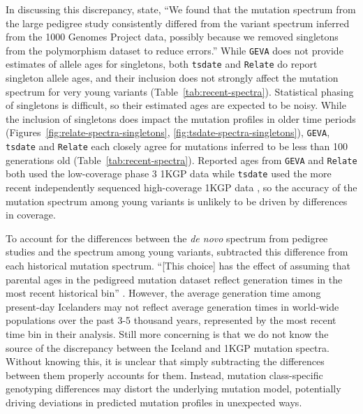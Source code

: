 \documentclass[]{article}
\newcommand{\GEVA}{\texttt{GEVA}\xspace}
\newcommand{\tsdate}{\texttt{tsdate}\xspace}
\newcommand{\relate}{\texttt{Relate}\xspace}
\begin{document}
In discussing this discrepancy, \citet{wang2023human} state, ``We found that
the mutation spectrum from the large pedigree study consistently differed from
the variant spectrum inferred from the 1000 Genomes Project data, possibly
because we removed singletons from the polymorphism dataset to reduce errors.''
While \GEVA does not provide estimates of allele ages for singletons, both
\tsdate and \relate do report singleton allele ages, and their inclusion does
not strongly affect the mutation spectrum for very young variants
(Table~\ref{tab:recent-spectra}). Statistical phasing of singletons is
difficult, so their estimated ages are expected to be noisy. While the
inclusion of singletons does impact the mutation profiles in older time periods
(Figures~\ref{fig:relate-spectra-singletons},
\ref{fig:tsdate-spectra-singletons}), \GEVA, \tsdate and \relate each closely
agree for mutations inferred to be less than 100 generations old
(Table~\ref{tab:recent-spectra}). Reported ages from \GEVA and \relate both
used the low-coverage phase 3 1KGP data while \tsdate used the more recent
independently sequenced high-coverage 1KGP data \citep{byrska2022high}, so the
accuracy of the mutation spectrum among young variants is unlikely to be driven
by differences in coverage.

To account for the differences between the \emph{de novo} spectrum from
pedigree studies \citep{jonsson2017parental} and the spectrum among young
variants, \citet{wang2023human} subtracted this difference from each historical
mutation spectrum. ``[This choice] has the effect of assuming that parental ages
in the pedigreed mutation dataset reflect generation times in the most recent
historical bin'' \citep{wang2023human}. However, the average generation time
among present-day Icelanders may not reflect average generation times in
world-wide populations over the past 3-5 thousand years, represented by the
most recent time bin in their analysis. Still more concerning is that we do not
know the source of the discrepancy between the Iceland and 1KGP mutation
spectra. Without knowing this, it is unclear that simply subtracting the
differences between them properly accounts for them. Instead, mutation
class-specific genotyping differences may distort the underlying mutation
model, potentially driving deviations in predicted mutation profiles in
unexpected ways.
\end{document}
